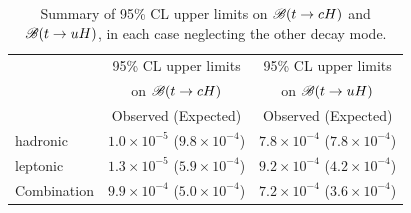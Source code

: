 \documentclass[PAPER, coverpage, atlasdraft=true, texlive=2016, UKenglish]{\ATLASLATEXPATH atlasdoc}
\providecommand{\DIFadd}[1]{{\protect\color{blue}\uwave{#1}}} %
\providecommand{\DIFdel}[1]{{\protect\color{red}\sout{#1}}}                      %
\providecommand{\DIFaddFL}[1]{\DIFadd{#1}} %
\providecommand{\DIFdelFL}[1]{\DIFdel{#1}} %
\providecommand{\DIFaddbeginFL}{} %
\providecommand{\DIFaddendFL}{} %
\providecommand{\DIFdelbeginFL}{} %
\providecommand{\DIFdelendFL}{} %
\begin{document}

\begin{table}[t!]
\caption{\small{Summary of 95\% CL upper limits on $\mathscr{B}(t \to cH)$ and $\mathscr{B}(t \to uH)$, in each case neglecting the other decay mode. }}
\begin{center}
\begin{tabular}{lcc}
\toprule\toprule
 & \multicolumn{1}{c}{95\% CL upper limits} & \multicolumn{1}{c}{95\% CL upper limits}  \\
 & \multicolumn{1}{c}{on $\mathscr{B}(t \to cH)$} & \multicolumn{1}{c}{on $\mathscr{B}(t \to uH)$} \\
 &  Observed (Expected) & Observed (Expected)  \\
\midrule\midrule
hadronic  & \DIFdelbeginFL \DIFdelFL{$1.0 \times 10^{-5}$ }\DIFdelendFL \DIFaddbeginFL \DIFaddFL{$1.0 \times 10^{-3}$ }\DIFaddendFL ($9.8 \times 10^{-4}$) & $7.8 \times 10^{-4}$ ($7.8 \times 10^{-4}$) \\ 
leptonic  & \DIFdelbeginFL \DIFdelFL{$1.3 \times 10^{-5}$ }\DIFdelendFL \DIFaddbeginFL \DIFaddFL{$1.3 \times 10^{-3}$ }\DIFaddendFL ($5.9 \times 10^{-4}$) & $9.2 \times 10^{-4}$ ($4.2 \times 10^{-4}$) \\
\midrule
Combination  & $9.9 \times 10^{-4}$ ($5.0 \times 10^{-4}$) & $7.2 \times 10^{-4}$ ($3.6 \times 10^{-4}$) \\
\bottomrule\bottomrule
\end{tabular}
\label{tab:limits_summary}
\end{center}
\end{table}
\end{document}
